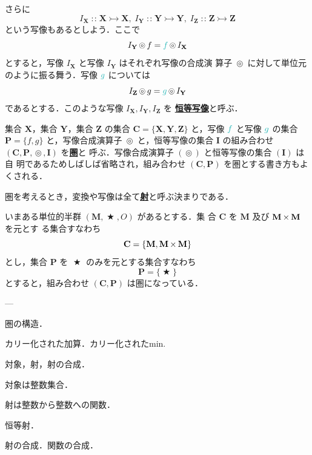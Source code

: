 \documentclass[a5paper,twoside,fleqn,draft]{jsbook}
\def\funcColor{BlueGreen}
\newcommand{\keyword}[1]{{\underline{\textbf{#1}}}}
\newcommand{\mFunc}[1]{\textcolor{\funcColor}{#1}}
\newcommand{\mFFunc}{{\mFunc{f}}}
\newcommand{\mGFunc}{\mFunc{g}}
\DeclareMathOperator{\mBinOp}{\bigstar}
\DeclareMathOperator{\mCompProj}{\circledcirc}
\DeclareMathOperator{\mIn}{{:\!:}}
\DeclareMathOperator{\mMorphTo}{\rightarrowtail} %
\DeclareMathOperator{\mSetTimes}{\bf{\times}} %
\newcommand{\mSet}[1]{\mathbf{#1}}
\newcommand{\mTupleWith}[1]{\left(#1\right)}
\newcommand{\mMorph}[2]{#1\mMorphTo#2} %
\begin{document}
さらに
\begin{equation}
I_\mSet{X}\mIn\mMorph{\mSet{X}}{\mSet{X}},\;
I_\mSet{Y}\mIn\mMorph{\mSet{Y}}{\mSet{Y}},\;
I_\mSet{Z}\mIn\mMorph{\mSet{Z}}{\mSet{Z}}
\end{equation}
という写像もあるとしよう．ここで
\begin{equation}
I_\mSet{Y}\mCompProj f=\mFFunc\mCompProj I_\mSet{X}
\end{equation}
とすると，写像 $I_\mSet{X}$ と写像 $I_\mSet{Y}$ はそれぞれ写像の合成演
算子 $\mCompProj$ に対して単位元のように振る舞う．写像 $\mGFunc$ については
\begin{equation}
I_\mSet{Z}\mCompProj g=\mGFunc\mCompProj I_\mSet{Y}
\end{equation}
であるとする．このような写像 $I_\mSet{X},I_\mSet{Y},I_\mSet{Z}$ を
\keyword{恒等写像}と呼ぶ．

集合 $\mSet{X}$，集合 $\mSet{Y}$，集合 $\mSet{Z}$ の集合
$\mSet{C}=\{\mSet{X},\mSet{Y},\mSet{Z}\}$ と，写像 $\mFFunc$ と写像
$\mGFunc$ の集合 $\mSet{P}=\{f,g\}$ と，写像合成演算子 $\mCompProj$
と，恒等写像の集合 $\mSet{I}$ の組み合わせ
$\mTupleWith{\mSet{C},\mSet{P},\mCompProj,\mSet{I}}$ を\keyword{圏}と
呼ぶ．写像合成演算子 $(\mCompProj)$ と恒等写像の集合 $(\mSet{I})$ は自
明であるためしばしば省略され，組み合わせ
$\mTupleWith{\mSet{C},\mSet{P}}$ を圏とする書き方もよくされる．

圏を考えるとき，変換や写像は全て\keyword{射}と呼ぶ決まりである．

いまある単位的半群 $\mTupleWith{\mSet{M},\mBinOp,O}$ があるとする．集
合 $\mSet{C}$ を $\mSet{M}$ 及び $\mSet{M}\mSetTimes\mSet{M}$ を元とす
る集合すなわち
\begin{equation}
\mSet{C}=\{\mSet{M},\mSet{M}\mSetTimes\mSet{M}\}
\end{equation}
とし，集合 $\mSet{P}$ を $\mBinOp$ のみを元とする集合すなわち
\begin{equation}
\mSet{P}=\{\mBinOp\}
\end{equation}
とすると，組み合わせ $\mTupleWith{\mSet{C},\mSet{P}}$ は圏になっている．

---

圏の構造．

カリー化された加算．カリー化されたmin.

対象，射，射の合成．

対象は整数集合．

射は整数から整数への関数．

恒等射．

射の合成．関数の合成．
\end{document}
